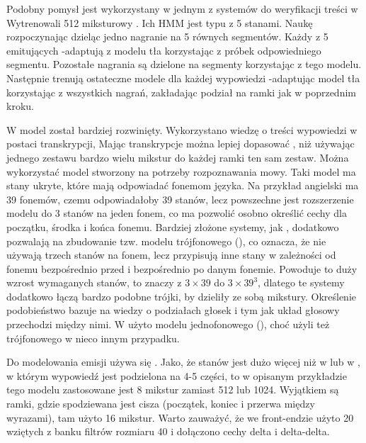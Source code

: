 Podobny pomysł jest wykorzystany w jednym z systemów do weryfikacji treści w \cite{utteranceVerificationFor}
Wytrenowali 512 miksturowy . Ich HMM jest typu  z 5 stanami.
Naukę rozpoczynając dzieląc jedno nagranie na 5 równych segmentów.
Każdy z 5  emitujących -adaptują z modelu tła korzystając z próbek odpowiedniego segmentu.
Pozostałe nagrania są dzielone na segmenty korzystając z tego modelu. Następnie trenują ostateczne modele dla każdej
wypowiedzi -adaptując model tła korzystając z wszystkich nagrań, zakładając podział na ramki jak
w poprzednim kroku.

W \cite{comparisonOfMultiple}
model  został bardziej rozwinięty. Wykorzystano wiedzę o treści wypowiedzi w postaci transkrypcji,
Mając transkrypcje można lepiej dopasować , niż używając jednego zestawu bardzo wielu mikstur
do każdej ramki ten sam zestaw.
Można wykorzystać model stworzony na potrzeby rozpoznawania mowy.
Taki model ma stany ukryte, które mają odpowiadać fonemom języka. Na przykład angielski ma 39
fonemów, czemu odpowiadałoby 39 stanów, lecz powszechne jest rozszerzenie
modelu do 3 stanów na jeden fonem, co ma pozwolić osobno określić cechy dla początku, środka i końca fonemu.
Bardziej złożone systemy, jak \cite{theHtkBook}
, dodatkowo pozwalają na zbudowanie tzw. modelu trójfonowego (), co oznacza,
że nie używają trzech stanów na fonem, lecz
przypisują inne stany w zależności od fonemu bezpośrednio przed i bezpośrednio po danym fonemie.
Powoduje to duży wzrost wymaganych stanów, to znaczy z $3 \times 39$ do $3 \times 39^3$,
dlatego te systemy dodatkowo łączą bardzo podobne trójki, by dzieliły ze sobą mikstury.
Określenie podobieństwo bazuje na wiedzy o podziałach głosek i tym jak układ głosowy przechodzi między nimi.
W \cite{comparisonOfMultiple}
użyto modelu jednofonowego (), choć użyli też trójfonowego w nieco innym przypadku.

Do modelowania emisji używa się . Jako, że stanów jest dużo więcej niż w 
lub w , w którym wypowiedź jest podzielona na 4-5 części, to
w opisanym przykładzie tego modelu zastosowane jest 8 mikstur zamiast 512 lub 1024. Wyjątkiem są ramki,
gdzie spodziewana jest cisza (początek, koniec i przerwa między wyrazami), tam
użyto 16 mikstur. Warto zauważyć, że we front-endzie użyto 20  wziętych z banku filtrów rozmiaru
40 i dołączono cechy delta i delta-delta.

